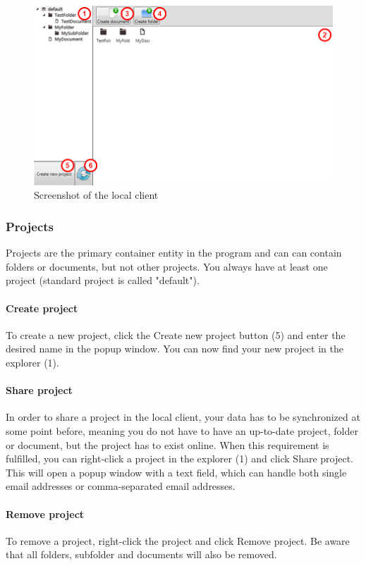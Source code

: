 \begin{figure}[htb]
\centering
\includegraphics[width=1\textwidth]{User_manual/graphics/local.png}
\caption{Screenshot of the local client}
\end{figure}

\subsubsection{Projects}
Projects are the primary container entity in the program and can can contain folders or documents, but not other projects. You always have at least one project (standard project is called "default").

\paragraph{Create project}
To create a new project, click the Create new project button (5) and enter the desired name in the popup window. You can now find your new project in the explorer (1).

\paragraph{Share project}
In order to share a project in the local client, your data has to be synchronized at some point before, meaning you do not have to have an up-to-date project, folder or document, but the project has to exist online. When this requirement is fulfilled, you can right-click a project in the explorer (1) and click Share project. This will open a popup window with a text field, which can handle both single email addresses or comma-separated email addresses.

\paragraph{Remove project}
To remove a project, right-click the project and click Remove project. Be aware that all folders, subfolder and documents will also be removed.

